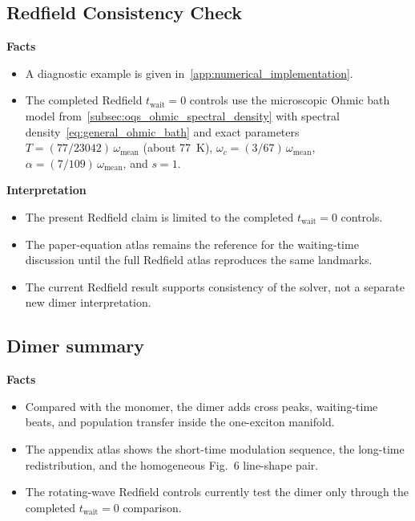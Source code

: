 \subsection{Redfield Consistency Check}
\label{subsec:results_dimer_redfield}

\textbf{Facts}
\begin{itemize}
    \item A diagnostic example is given in~\autoref{app:numerical_implementation}.
  \item The completed Redfield $t_{\mathrm{wait}}=0$ controls use the microscopic Ohmic bath model from~\autoref{subsec:oqs_ohmic_spectral_density} with spectral density~\autoref{eq:general_ohmic_bath} and exact parameters $T=(77/23042)\,\omega_{\mathrm{mean}}$ (about \SI{77}{\kelvin}), $\omega_c=(3/67)\,\omega_{\mathrm{mean}}$, $\alpha=(7/109)\,\omega_{\mathrm{mean}}$, and $s=1$.
\end{itemize}

\textbf{Interpretation}
\begin{itemize}
    \item The present Redfield claim is limited to the completed $t_{\mathrm{wait}}=0$ controls.
    \item The paper-equation atlas remains the reference for the waiting-time discussion until the full Redfield atlas reproduces the same landmarks.
    \item The current Redfield result supports consistency of the solver, not a separate new dimer interpretation.
\end{itemize}

\subsection{Dimer summary}
\label{subsec:results_dimer_summary}

\textbf{Facts}
\begin{itemize}
    \item Compared with the monomer, the dimer adds cross peaks, waiting-time beats, and population transfer inside the one-exciton manifold.
    \item The appendix atlas shows the short-time modulation sequence, the long-time redistribution, and the homogeneous Fig.~6 line-shape pair.
    \item The rotating-wave Redfield controls currently test the dimer only through the completed $t_{\mathrm{wait}}=0$ comparison.
\end{itemize}

